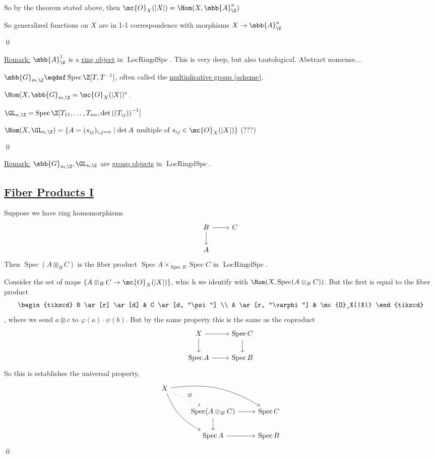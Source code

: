 \documentclass[x11names,reqno,14pt]{extarticle}
\DeclareMathOperator{\Spec}{Spec}
\DeclareMathOperator{\LRS}{LocRingdSpc}
\begin{document}
So by the theorem stated above, then $\mc{O}_X(|X|) = \Hom(X,\mbb{A}_\Z^n)$

So generalized functions on $X$ are in 1-1 correspondence with morphisms $X \to \mbb{A}_\Z^n$

\qed

\underline{Remark:} $\mbb{A}_\Z^1$ is a \underline{ring object} in $\LRS$. This is very deep, but also tautological. Abstract nonsense...



$\mbb{G}_{m,\Z} \eqdef \Spec \Z[T,T^{-1}]$, often called the \underline{multiplicative group (scheme)}. 

\cor

$\Hom(X,\mbb{G}_{m,\Z} = \mc{O}_X(|X|)^*$. 


$\GL_{n,\Z} = \Spec \Z[T_{11},\dots,T_{nn}, \det\left((T_{ij})\right)^{-1}]$

\cor

$\Hom(X,\GL_{n,\Z}) = \{A = (s_{ij})_{i,j = n}\mid \det A$ multiple of $s_{ij} \in \mc{O}_X(|X|)\}$ (???)

\proof

\qed

\underline{Remark:} $\mbb{G}_{m,\Z}, \GL_{n,\Z}$ are \underline{group objects} in $\LRS$.

\subsection*{\underline{Fiber Products I}}

\lem

Suppose we have ring homomorphisms
\[
\begin{tikzcd}
B\ar[r] \ar[d] & C \\
A & 
\end{tikzcd}
\]
Then $\Spec(A\otimes_BC)$ is the fiber product $\Spec A\times_{\Spec B}\Spec C$ in $\LRS$.

\proof

Consider the set of maps $\{A\otimes_BC \to \mc{O}_X(|X|)\}$, whic h we identify with $\Hom(X,\Spec (A\otimes_BC))$. But the first is equal to the fiber product
\[
\begin{tikzcd}
B \ar[r] \ar[d] & C \ar[d, "\psi"] \\
A \ar[r, "\varphi"] & \mc{O}_X(|X|)
\end{tikzcd}
\]
, where we send $a\otimes c$ to $\varphi(a)\cdot\psi(b)$. But by the same property this is the same as the coproduct 
\[
\begin{tikzcd}
X \ar[r] \ar[d] & \Spec C\ar[d] \\
\Spec A \ar[r] &\Spec B
\end{tikzcd}
\]
So this is establishes the universal property, 
\[
\begin{tikzcd}
X \ar[drr, bend left = 20] \ar[ddr, bend right = 20] \ar[dr,dotted,"\exists!"] & & \\
& \Spec (A\otimes_BC) \ar[r] \ar[d] & \Spec C \\
& \Spec A \ar[r] & \Spec B
\end{tikzcd}
\]
\qed
\end{document}
